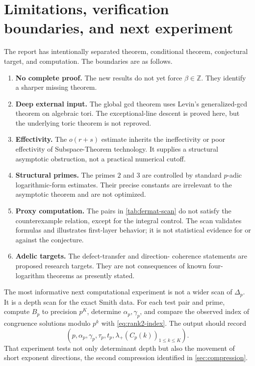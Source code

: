 \documentclass[11pt,oneside]{article}
\theoremstyle{definition}
\newcommand{\Z}{\mathbb{Z}}
\begin{document}
\section{Limitations, verification boundaries, and next experiment}
\label{sec:limitations}

The report has intentionally separated theorem, conditional theorem,
conjectural target, and computation.  The boundaries are as follows.

\begin{enumerate}
  \item \textbf{No complete proof.}  The new results do not yet force
        $\beta\in\Z$.  They identify a sharper missing theorem.
  \item \textbf{Deep external input.}  The global gcd theorem uses Levin's
        generalized-gcd theorem on algebraic tori.  The exceptional-line
        descent is proved here, but the underlying toric theorem is not
        reproved.
  \item \textbf{Effectivity.}  The $o(r+s)$ estimate inherits the
        ineffectivity or poor effectivity of Subspace-Theorem technology.
        It supplies a structural asymptotic obstruction, not a practical
        numerical cutoff.
  \item \textbf{Structural primes.}  The primes $2$ and $3$ are controlled
        by standard $p$-adic logarithmic-form estimates.  Their precise
        constants are irrelevant to the asymptotic theorem and are not
        optimized.
  \item \textbf{Proxy computation.}  The pairs in
        \cref{tab:fermat-scan} do not satisfy the counterexample relation,
        except for the integral control.  The scan validates formulas and
        illustrates first-layer behavior; it is not statistical evidence
        for or against the conjecture.
  \item \textbf{Adelic targets.}  The defect-transfer and direction-
        coherence statements are proposed research targets.  They are not
        consequences of known four-logarithm theorems as presently stated.
\end{enumerate}

The most informative next computational experiment is not a wider scan of
$\Delta_p$.  It is a depth scan for the exact Smith data.  For each test
pair and prime, compute $B_p$ to precision $p^K$, determine
$\alpha_p,\gamma_p$, and compare the observed index of congruence solutions
modulo $p^k$ with \eqref{eq:rank2-index}.  The output should record
\begin{equation}\label{eq:next-experiment-output}
  (p,\alpha_p,\gamma_p,\tau_p,t_p,
   \lambda_+(C_p(k))_{1\le k\le K}).
\end{equation}
That experiment tests not only determinant depth but also the movement of
short exponent directions, the second compression identified in
\cref{sec:compression}.
\end{document}
